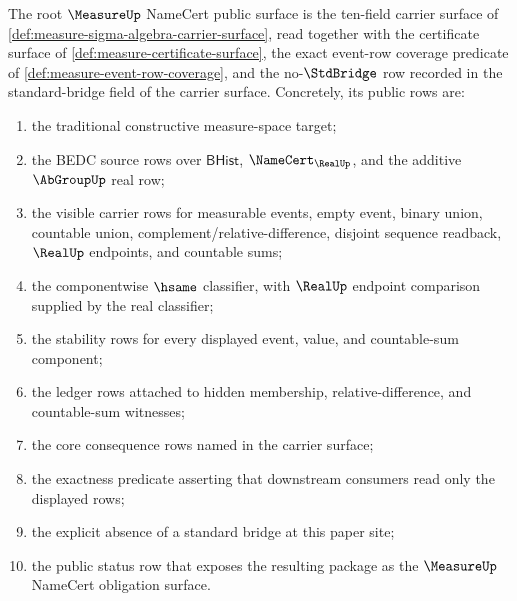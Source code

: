 \begin{definition}
\label{def:measure-root-namecert-public-surface}
The root $\MeasureUp$ NameCert public surface is the ten-field carrier surface
of \autoref{def:measure-sigma-algebra-carrier-surface}, read together with the
certificate surface of \autoref{def:measure-certificate-surface}, the exact
event-row coverage predicate of \autoref{def:measure-event-row-coverage}, and
the no-$\StdBridge$ row recorded in the standard-bridge field of the carrier
surface. Concretely, its public rows are:
\begin{enumerate}
  \item the traditional constructive measure-space target;
  \item the BEDC source rows over $\mathsf{BHist}$, $\NameCert_{\RealUp}$, and
  the additive $\AbGroupUp$ real row;
  \item the visible carrier rows for measurable events, empty event, binary
  union, countable union, complement/relative-difference, disjoint sequence
  readback, $\RealUp$ endpoints, and countable sums;
  \item the componentwise $\hsame$ classifier, with $\RealUp$ endpoint
  comparison supplied by the real classifier;
  \item the stability rows for every displayed event, value, and countable-sum
  component;
  \item the ledger rows attached to hidden membership, relative-difference,
  and countable-sum witnesses;
  \item the core consequence rows named in the carrier surface;
  \item the exactness predicate asserting that downstream consumers read only
  the displayed rows;
  \item the explicit absence of a standard bridge at this paper site;
  \item the public status row that exposes the resulting package as the
  $\MeasureUp$ NameCert obligation surface.
\end{enumerate}
\end{definition}


